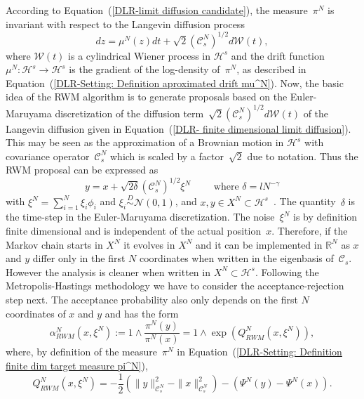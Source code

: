 According to Equation~(\ref{DLR-limit diffusion candidate}), the measure~$\pi^N$ is invariant with respect to the Langevin diffusion process
\begin{equation}
 \label{DLR- finite dimensional limit diffusion}
 dz = \mu^N (z) dt + \sqrt{2} (\mathcal{C}_s^N)^{1/2} d\mathcal{W}(t),
\end{equation}
where $\mathcal{W}(t)$ is a cylindrical Wiener process in $\mathcal{H}^s$ and the drift function ~$\mu^N : \mathcal{H}^s \to \mathcal{H}^s$ is the gradient of the log-density of~$\pi^N$, as described in Equation~(\ref{DLR-Setting: Definition aproximated drift mu^N}). Now, the basic idea of the RWM algorithm is to generate proposals based on the Euler-Maruyama discretization of the diffusion term~$ \sqrt{2} (\mathcal{C}_s^N)^{1/2} d\mathcal{W}(t) $ of the Langevin diffusion given in Equation~(\ref{DLR- finite dimensional limit diffusion}). This may be seen as the approximation of a Brownian motion in $\mathcal{H}^s$ with covariance operator~$\mathcal{C}_s^N$ which is scaled by a factor~$\sqrt{2}$ due to notation. Thus the RWM proposal can be expressed as
\begin{equation}
\label{DLR-Setting: Definiton RWM-proposal}
 y = x + \sqrt{2 \delta} (\mathcal{C}_s^{N})^{1/2} \xi^{N} \qquad \text{ where } \delta = l N^{-\gamma}
\end{equation}
with  $\xi^{N} = \sum_{i=1}^{N} \xi_i \phi_i$ and $\xi_i \stackrel{D}{\sim} \mathcal{N}(0,1)$, and $x, y \in X^{N} \subset \mathcal{H}^s$~\autocite[Equation (1.11)]{Mattingly2010}. The quantity~$\delta$ is the time-step in the Euler-Maruyama discretization. The noise~$\xi^N$ is by definition finite dimensional and is independent of the actual position~$x$. Therefore, if the Markov chain starts in $X^N$ it evolves in $X^N$ and it can be implemented in $\mathbb{R}^N$ as $x$ and $ y$ differ only in the first $N$ coordinates when written in the eigenbasis of~$\mathcal{C}_s$. However the analysis is cleaner when written in $X^N \subset \mathcal{H}^s$. Following the Metropolis-Hastings methodology we have to consider the acceptance-rejection step next. The acceptance probability also only depends on the first $N$ coordinates of $x$ and $y$ and has the form
\begin{equation}
 \label{DLR-Setting: Definition acceptance proba RWM}
 \alpha^N_{RWM}(x, \xi^N) := 1 \wedge \frac{\pi^N(y)}{\pi^N(x)} = 1 \wedge \exp (Q^N_{RWM}(x, \xi^N) ),
\end{equation}
where, by definition of the measure~$\pi^N$ in Equation~(\ref{DLR-Setting: Definition finite dim target measure pi^N}),
\begin{equation}
 Q_{RWM}^{N}(x, \xi^{N}) = - \frac{1}{2} \left(\| y \|_{\mathcal{C}_s^N}^2 - \| x \|_{\mathcal{C}_s^N}^2\right) - \left( \Psi^N(y) - \Psi^N(x) \right).
\end{equation}

